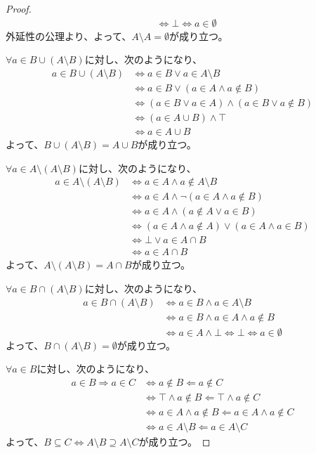 \documentclass[a4paper]{jsarticle}
\begin{document}
\begin{proof}
\begin{align*}
&\Leftrightarrow \bot \Leftrightarrow a \in \emptyset
\end{align*}
外延性の公理より、よって、$A \setminus A = \emptyset$が成り立つ。\par
$\forall a \in B \cup (A \setminus B)$に対し、次のようになり、
\begin{align*}
a \in B \cup (A \setminus B) &\Leftrightarrow a \in B \vee a \in A \setminus B\\
&\Leftrightarrow a \in B \vee (a \in A \land a \notin B)\\
&\Leftrightarrow (a \in B \vee a \in A) \land (a \in B \vee a \notin B)\\
&\Leftrightarrow (a \in A \cup B) \land \top\\
&\Leftrightarrow a \in A \cup B
\end{align*}
よって、$B \cup (A \setminus B) = A \cup B$が成り立つ。\par
$\forall a \in A \setminus (A \setminus B)$に対し、次のようになり、
\begin{align*}
a \in A \setminus (A \setminus B) &\Leftrightarrow a \in A \land a \notin A \setminus B\\
&\Leftrightarrow a \in A \land \neg(a \in A \land a \notin B)\\
&\Leftrightarrow a \in A \land (a \notin A \vee a \in B)\\
&\Leftrightarrow (a \in A \land a \notin A) \vee (a \in A \land a \in B)\\
&\Leftrightarrow \bot \vee a \in A \cap B\\
&\Leftrightarrow a \in A \cap B
\end{align*}
よって、$A \setminus (A \setminus B) = A \cap B$が成り立つ。\par
$\forall a \in B \cap (A \setminus B)$に対し、次のようになり、
\begin{align*}
a \in B \cap (A \setminus B) &\Leftrightarrow a \in B \land a \in A \setminus B\\
&\Leftrightarrow a \in B \land a \in A \land a \notin B\\
&\Leftrightarrow a \in A \land \bot \Leftrightarrow \bot \Leftrightarrow a \in \emptyset
\end{align*}
よって、$B \cap (A \setminus B) = \emptyset$が成り立つ。\par
$\forall a \in B$に対し、次のようになり、
\begin{align*}
a \in B \Rightarrow a \in C &\Leftrightarrow a \notin B \Leftarrow a \notin C\\
&\Leftrightarrow \top \land a \notin B \Leftarrow \top \land a \notin C\\
&\Leftrightarrow a \in A \land a \notin B \Leftarrow a \in A \land a \notin C\\
&\Leftrightarrow a \in A \setminus B \Leftarrow a \in A \setminus C
\end{align*}
よって、$B \subseteq C \Leftrightarrow A \setminus B \supseteq A \setminus C$が成り立つ。
\end{proof}
\end{document}
